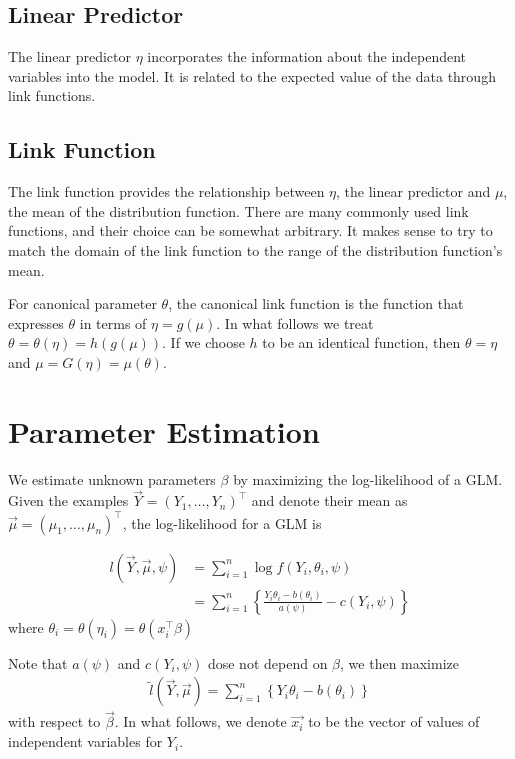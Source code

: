 \subsection{Linear Predictor}
The linear predictor $\eta$ incorporates the information about the independent variables into the model. It is related to the expected value of the data through link functions.

\subsection{Link Function}
The link function provides the relationship between $\eta$, the linear predictor and $\mu$, the mean of the distribution function. There are many commonly used link functions, and their choice can be somewhat arbitrary. It makes sense to try to match the domain of the link function to the range of the distribution function's mean.

For canonical parameter $\theta$, the canonical link function is the function that expresses $\theta$ in terms of $\eta = g(\mu)$. In what follows we treat $\theta = \theta(\eta) = h(g(\mu))$. If we choose $h$ to be an identical function, then $\theta = \eta$
and $\mu = G(\eta) = \mu(\theta)$.

\section{Parameter Estimation}
We estimate unknown parameters $\beta$ by maximizing the log-likelihood of a GLM. Given the examples $\vec{Y} = (Y_1, \dots, Y_n)^\top$ and denote their mean as $\vec{\mu} = (\mu_1, \dots, \mu_{n})^\top$, the log-likelihood for a GLM is

\begin{align*}
l(\vec{Y}, \vec{\mu}, \psi) & =\sum_{i=1}^{n} \log f(Y_i, \theta_{i}, \psi) \\
& =\sum_{i=1}^{n}\left\{ \frac{Y_i \theta_{i} - b\left(\theta_{i}\right)}{a\left(\psi\right)} - c(Y_i, \psi)\right\}
\end{align*}
where $\theta_{i} = \theta(\eta_{i}) = \theta(x_i^\top \beta)$

Note that $a(\psi)$ and $c(Y_i, \psi)$ dose not depend on $\beta$, we then maximize
\begin{align}
\label{likelihood}
\tilde{l}(\vec{Y}, \vec{\mu}) = \sum_{i = 1}^{n} \left\{ Y_i \theta_{i} - b(\theta_{i}) \right\}
\end{align}
with respect to $\vec{\beta}$.
In what follows, we denote $\vec{x_i}$ to be the vector of values of independent variables for $Y_i$.
